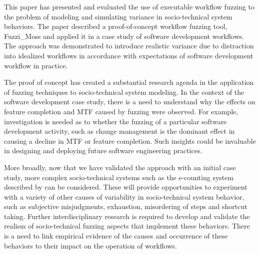 \documentclass{llncs}
\begin{document}
This paper has presented and evaluated the use of executable workflow fuzzing to the problem of modeling and simulating
variance in socio-technical system behaviors.  The paper described a proof-of-concept workflow fuzzing tool, Fuzzi\_Moss
and applied it in a case study of software development workflows.  The approach was demonstrated to introduce realistic
variance due to distraction into idealized workflows in accordance with expectations of software development workflow in
practice.

The proof of concept has created a substantial research agenda in the application of fuzzing techniques to
socio-technical system modeling.  In the context of the software development case study, there is a need to understand
why the effects on feature completion and MTF caused by fuzzing were observed.  For example, investigation is needed as
to whether the fuzzing of a particular software development activity, such as change management is the dominant effect
in causing a decline in MTF or feature completion.  Such insights could be invaluable in designing and deploying future
software engineering practices.

More broadly, now that we have validated the approach with an initial case study, more complex socio-technical systems
such as the e-counting system described by \citet{lock07observations} can be considered.  These will provide
opportunities to experiment with a variety of other causes of variability in socio-technical system behavior, such as
subjective misjudgments, exhaustion, misordering of steps and shortcut taking.  Further interdisciplinary research is
required to develop and validate the realism of socio-technical fuzzing aspects that implement these behaviors. There is
a need to link empirical evidence of the causes and occurrence of these behaviors to their impact on the operation of
workflows.
\end{document}
